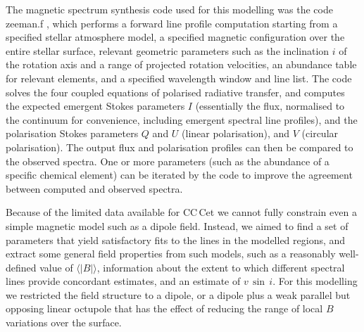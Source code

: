 \documentclass[fleqn,usenatbib]{mnras}
\newcommand{\bs}{\ensuremath{\langle \vert B \vert \rangle}}
\newcommand{\vsini}{\ensuremath{v\,\sin\,i}}
\begin{document}
The magnetic spectrum synthesis code used for this modelling was the code {\sc zeeman.f} \citep{landstreet88-1}, which performs a forward line profile computation starting from a specified stellar atmosphere model, a specified magnetic configuration over the entire stellar surface, relevant geometric parameters such as the inclination $i$ of the rotation axis and a range of projected rotation velocities, an abundance table for relevant elements, and a specified wavelength window and line list.  The code solves the four coupled equations of polarised radiative transfer, and computes the expected emergent Stokes parameters $I$ (essentially the flux, normalised to the continuum for convenience, including emergent spectral line profiles), and the polarisation Stokes parameters $Q$ and $U$ (linear polarisation), and $V$ (circular polarisation). The output flux and polarisation profiles can then be compared to the observed spectra. One or more parameters (such as the abundance of a specific chemical element) can be iterated by the code to improve the agreement between computed and observed spectra.

Because of the limited data available for CC\,Cet we cannot fully constrain even a simple magnetic model such as a dipole field. Instead, we aimed to find a set of parameters that yield satisfactory fits to the lines in the modelled regions, and extract some general field properties from such models, such as a reasonably well-defined value of \bs, information about the extent to which different spectral lines provide concordant estimates, and an estimate of \vsini. For this modelling we restricted the field structure to a dipole, or a dipole plus a weak parallel but opposing linear octupole that has the effect of reducing the range of local $B$ variations over the surface.


\end{document}
